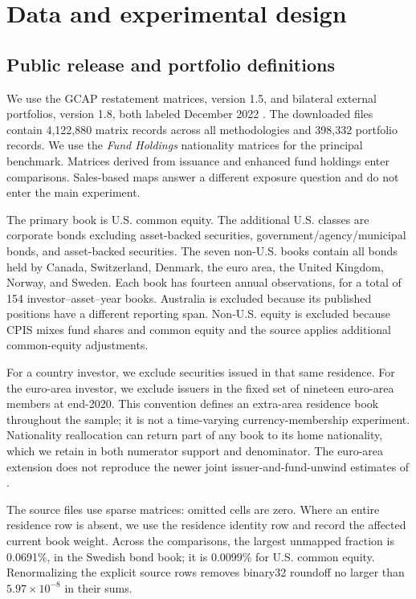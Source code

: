\documentclass[11pt,a4paper]{article}
\begin{document}
\section{Data and experimental design}
\subsection{Public release and portfolio definitions}
We use the GCAP restatement matrices, version 1.5, and bilateral external portfolios, version 1.8, both labeled December 2022 \citep{mapsdoc,positionsdoc}. The downloaded files contain 4,122,880 matrix records across all methodologies and 398,332 portfolio records. We use the \emph{Fund Holdings} nationality matrices for the principal benchmark. Matrices derived from issuance and enhanced fund holdings enter comparisons. Sales-based maps answer a different exposure question and do not enter the main experiment.

The primary book is U.S. common equity. The additional U.S. classes are corporate bonds excluding asset-backed securities, government/agency/municipal bonds, and asset-backed securities. The seven non-U.S. books contain all bonds held by Canada, Switzerland, Denmark, the euro area, the United Kingdom, Norway, and Sweden. Each book has fourteen annual observations, for a total of 154 investor--asset--year books. Australia is excluded because its published positions have a different reporting span. Non-U.S. equity is excluded because CPIS mixes fund shares and common equity and the source applies additional common-equity adjustments.

For a country investor, we exclude securities issued in that same residence. For the euro-area investor, we exclude issuers in the fixed set of nineteen euro-area members at end-2020. This convention defines an extra-area residence book throughout the sample; it is not a time-varying currency-membership experiment. Nationality reallocation can return part of any book to its home nationality, which we retain in both numerator support and denominator. The euro-area extension does not reproduce the newer joint issuer-and-fund-unwind estimates of \citet{beck}.

The source files use sparse matrices: omitted cells are zero. Where an entire residence row is absent, we use the residence identity row and record the affected current book weight. Across the comparisons, the largest unmapped fraction is 0.0691\%, in the Swedish bond book; it is 0.0099\% for U.S. common equity. Renormalizing the explicit source rows removes binary32 roundoff no larger than $5.97\times10^{-8}$ in their sums.
\end{document}
